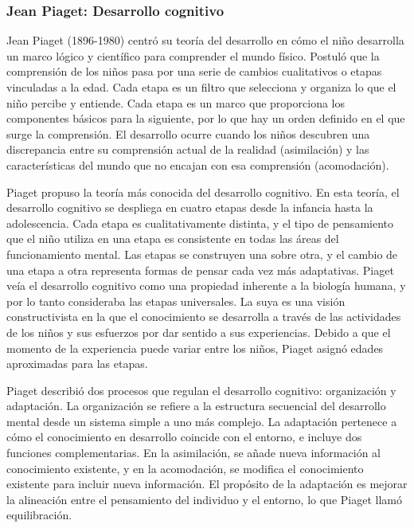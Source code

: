 \documentclass[11pt,letterpaper]{report}
\begin{document}
\subsubsection{Jean Piaget: Desarrollo cognitivo}
Jean Piaget (1896-1980) centró su teoría del desarrollo en cómo el niño
desarrolla un marco lógico y científico para comprender el mundo físico.
Postuló que la comprensión de los niños pasa por una serie de cambios
cualitativos o etapas vinculadas a la edad. Cada etapa es un filtro que
selecciona y organiza lo que el niño percibe y entiende. Cada etapa es un marco
que proporciona los componentes básicos para la siguiente, por lo que hay un
orden definido en el que surge la comprensión. El desarrollo ocurre cuando los
niños descubren una discrepancia entre su comprensión actual de la realidad
(asimilación) y las características del mundo que no encajan con esa
comprensión (acomodación). \cite{Feldman3}

Piaget propuso la teoría más conocida del desarrollo cognitivo. En esta teoría,
el desarrollo cognitivo se despliega en cuatro etapas desde la infancia hasta
la adolescencia. Cada etapa es cualitativamente distinta, y el tipo de
pensamiento que el niño utiliza en una etapa es consistente en todas las áreas
del funcionamiento mental. Las etapas se construyen una sobre otra, y el cambio
de una etapa a otra representa formas de pensar cada vez más adaptativas.
Piaget veía el desarrollo cognitivo como una propiedad inherente a la biología
humana, y por lo tanto consideraba las etapas universales. La suya es una
visión constructivista en la que el conocimiento se desarrolla a través de las
actividades de los niños y sus esfuerzos por dar sentido a sus experiencias.
Debido a que el momento de la experiencia puede variar entre los niños, Piaget
asignó edades aproximadas para las etapas. \cite{Gauvain2022}

Piaget describió dos procesos que regulan el desarrollo cognitivo: organización
y adaptación. La organización se refiere a la estructura secuencial del
desarrollo mental desde un sistema simple a uno más complejo. La adaptación
pertenece a cómo el conocimiento en desarrollo coincide con el entorno, e
incluye dos funciones complementarias. En la asimilación, se añade nueva
información al conocimiento existente, y en la acomodación, se modifica el
conocimiento existente para incluir nueva información. El propósito de la
adaptación es mejorar la alineación entre el pensamiento del individuo y el
entorno, lo que Piaget llamó equilibración. \cite{Gauvain2022}
\end{document}
